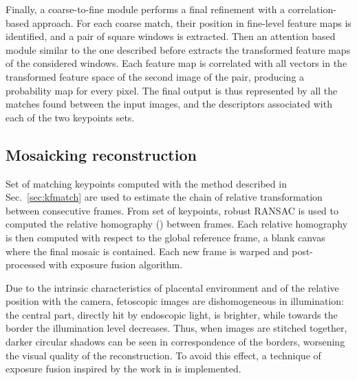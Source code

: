\documentclass[sn-basic]{sn-jnl}%
\begin{document}
Finally, a coarse-to-fine module performs a final refinement with a correlation-based approach. For each coarse match, their position in fine-level feature maps is identified, and a pair of square windows is extracted. Then an attention based module similar to the one described before extracts the transformed feature maps of the considered windows. Each feature map is correlated with all vectors in the transformed feature space of the second image of the pair, producing a probability map for every pixel. The final output is thus represented by all the matches found between the input images, and the descriptors associated with each of the two keypoints sets. 


\subsection{Mosaicking reconstruction} \label{sec:mosaicking_reconstruction}
Set of matching keypoints computed with the method described in Sec.~\ref{sec:kfmatch} are used to estimate the chain of relative transformation between consecutive frames. 
%
From set of keypoints, robust RANSAC is used to computed the relative homography () between frames. Each relative homography is then computed with respect to the global reference frame, a blank canvas where the final mosaic is contained. 
%
Each new frame is warped and post-processed with exposure fusion algorithm. 


Due to the intrinsic characteristics of placental environment and of the relative position with the camera, fetoscopic images are dishomogeneous in illumination: the central part, directly hit by endoscopic light, is brighter, while towards the border the illumination level decreases. Thus, when images are stitched together, darker circular shadows can be seen in correspondence of the borders, worsening the visual quality of the reconstruction. To avoid this effect, a technique of exposure fusion inspired by the work in \cite{Mertens2007} is implemented. %

\end{document}

